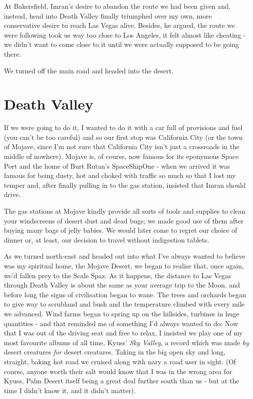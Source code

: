 \documentclass[a5paper,10pt,titlepage,draft]{book}
\begin{document}
At Bakersfield, Imran's desire to abandon the route we had been given and, instead, head into Death Valley finally triumphed over my own, more conservative desire to reach Las Vegas alive.  Besides, he argued, the route we were following took us way too close to Los Angeles, it felt almost like cheating - we didn't want to come close to it until we were actually supposed to be going there.

We turned off the main road and headed into the desert.

\section*{Death Valley}
If we were going to do it, I wanted to do it with a car full of provisions and fuel (you can't be too careful) and so our first stop was California City (or the town of Mojave, since I'm not sure that California City isn't just a crossroads in the middle of nowhere).  Mojave is, of course, now famous for its eponymous Space Port and the home of Burt Rutan's SpaceShipOne - when we arrived it was famous for being dusty, hot and choked with traffic so much so that I lost my temper and, after finally pulling in to the gas station, insisted that Imran should drive.

The gas stations at Mojave kindly provide all sorts of tools and supplies to clean your windscreens of desert dust and dead bugs; we made good use of them after buying many bags of jelly babies.  We would later come to regret our choice of dinner or, at least, our decision to travel without indigestion tablets.

As we turned north-east and headed out into what I've always wanted to believe was my spiritual home, the Mojave Desert, we began to realise that, once again, we'd fallen prey to the Scale Spaz.  As it happens, the distance to Las Vegas through Death Valley is about the same as your average trip to the Moon, and before long the signs of civilisation began to wane.  The trees and orchards began to give way to scrubland and bush and the temperature climbed with every mile we advanced.  Wind farms began to spring up on the hillsides, turbines in huge quantities - and that reminded me of something I'd always wanted to do:  Now that I was out of the driving seat and free to relax, I insisted we play one of my most favourite albums of all time, Kyuss' \emph{Sky Valley}, a record which was made \emph{by} desert creatures \emph{for} desert creatures.  Taking in the big open sky and long, straight, baking hot road we cruised along with nary a road user in sight.  (Of course, anyone worth their salt would know that I was in the wrong area for Kyuss, Palm Desert itself being a great deal further south than us - but at the time I didn't know it, and it didn't matter).
\end{document}
